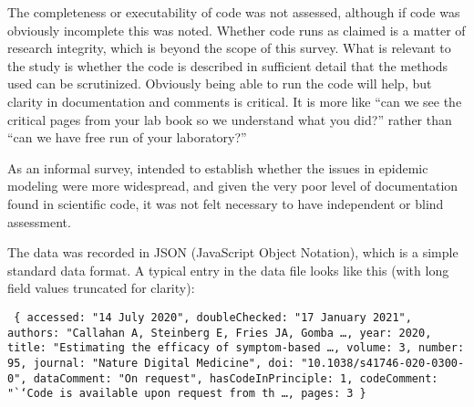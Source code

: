 \documentclass{article}
\begin{document}
The completeness or executability of code was not assessed, although if code was obviously incomplete this was noted. Whether code runs as claimed is a matter of research integrity, which is beyond the scope of this survey. What is relevant to the study is whether the code is described in sufficient detail that the methods used can be scrutinized. Obviously being able to run the code will help, but clarity in documentation and comments is critical. It is more like ``can we see the critical pages from your lab book so we understand what you did?'' rather than ``can we have free run of your laboratory?''

As an informal survey, intended to establish whether the issues in epidemic modeling were more widespread, and given the very poor level of documentation found in scientific code, it was not felt necessary to have independent or blind assessment.

The data was recorded in JSON (JavaScript Object Notation), which is a simple standard data format. A typical entry in the data file looks like this (with long field values truncated for clarity):

\def\countFields{30}
\noindent\texttt{
\hspace*{2em}\{\hspace*{2em}\newline
\hspace*{4em} accessed: "14 July 2020",\newline
\hspace*{4em} doubleChecked: "17 January 2021",\newline
\hspace*{4em} authors: "Callahan A, Steinberg E, Fries JA, Gomba \ldots,\newline
\hspace*{4em} year: 2020,\newline
\hspace*{4em} title: "Estimating the efficacy of symptom-based \ldots,\newline
\hspace*{4em} volume: 3,\newline
\hspace*{4em} number: 95,\newline
\hspace*{4em} journal: "Nature Digital Medicine",\newline
\hspace*{4em} doi: "10.1038/s41746-020-0300-0",\newline
\hspace*{4em} dataComment: "On request",\newline
\hspace*{4em} hasCodeInPrinciple: 1,\newline
\hspace*{4em} codeComment: "``Code is available upon request from th \ldots,\newline
\hspace*{4em} pages: 3\newline
\hspace*{2em}\}
}
\end{document}
